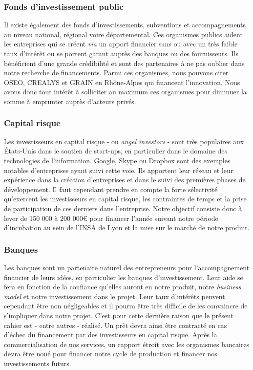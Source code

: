 \documentclass[10pt,twocolumn,a4paper,utf8x]{article}
\begin{document}
\subsubsection{Fonds d'investissement public}

Il existe également des fonds d'investissements, subventions et
accompagnements au niveau national, régional voire départemental. Ces
organismes publics aident les entreprises qui se créent \emph{via} un
apport financier sans ou avec un très faible taux d'intérêt ou se
portent garant auprès des banques ou des fournisseurs. Ils bénéficient
d'une grande crédibilité et sont des partenaires à ne pas oublier dans
notre recherche de financements. Parmi ces organismes, nous pouvons
citer OSEO, CREALYS et GRAIN en Rhône-Alpes qui financent l'innovation.
Nous avons donc tout intérêt à solliciter au maximum ces organismes pour
diminuer la somme à emprunter auprès d'acteurs privés.

\subsubsection{Capital risque}

Les investisseurs en capital risque - ou \emph{angel investors} - sont
très populaires aux États-Unis dans le soutien de start-ups, en
particulier dans le domaine des technologies de l'information. Google,
Skype ou Dropbox sont des exemples notables d'entreprises ayant suivi
cette voie. Ils apportent leur réseau et leur expérience dans la
création d'entreprises et dans le suivi des premières phases de
développement. Il faut cependant prendre en compte la forte sélectivité
qu'exercent les investisseurs en capital risque, les contraintes de
temps et la prise de participation de ces derniers dans l'entreprise.
Notre objectif consiste donc à lever de 150 000 à 200 000\euro{} pour
financer l'année suivant notre période d'incubation au sein de l'INSA de
Lyon et la mise sur le marché de notre produit.

\subsubsection{Banques}

Les banques sont un partenaire naturel des entrepreneurs pour
l'accompagnement financier de leurs idées, en particulier les banques
d'investissement. Leur aide se fera en fonction de la confiance qu'elles
auront en notre produit, notre \emph{business model} et notre
investissement dans le projet. Leur taux d'intérêts peuvent cependant
être non négligeables et il pourra être très difficile de les convaincre
de s'impliquer dans notre projet. C'est pour cette dernière raison que
le présent cahier est - entre autres - réalisé. Un prêt devra ainsi être
contracté en cas d'échec du financement par des investisseurs en capital
risque. Après la commercialisation de nos services, un rapport étroit
avec les organismes bancaires devra être noué pour financer notre cycle
de production et financer nos investissements futurs.
\end{document}
